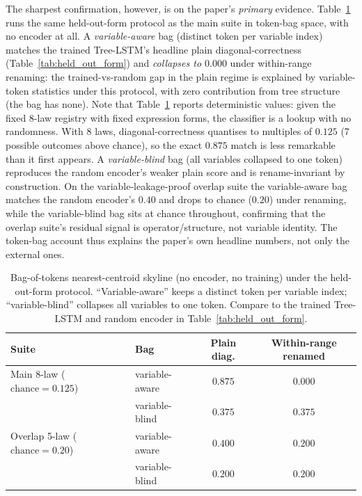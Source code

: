 The sharpest confirmation, however, is on the paper's \emph{primary} evidence. Table~\ref{tab:bagtokens} runs the same held-out-form protocol as the main suite in token-bag space, with no encoder at all. A \emph{variable-aware} bag (distinct token per variable index) matches the trained Tree-LSTM's headline plain diagonal-correctness (Table~\ref{tab:held_out_form}) and \emph{collapses to $0.000$} under within-range renaming: the trained-vs-random gap in the plain regime is explained by variable-token statistics under this protocol, with zero contribution from tree structure (the bag has none). Note that Table~\ref{tab:bagtokens} reports deterministic values: given the fixed 8-law registry with fixed expression forms, the classifier is a lookup with no randomness. With 8 laws, diagonal-correctness quantises to multiples of $0.125$ (7 possible outcomes above chance), so the exact $0.875$ match is less remarkable than it first appears. A \emph{variable-blind} bag (all variables collapsed to one token) reproduces the random encoder's weaker plain score and is rename-invariant by construction. On the variable-leakage-proof overlap suite the variable-aware bag matches the random encoder's $0.40$ and drops to chance ($0.20$) under renaming, while the variable-blind bag sits at chance throughout, confirming that the overlap suite's residual signal is operator/structure, not variable identity. The token-bag account thus explains the paper's own headline numbers, not only the external ones.

\begin{table}[h]
\centering
\caption{Bag-of-tokens nearest-centroid skyline (no encoder, no training) under the held-out-form protocol. ``Variable-aware'' keeps a distinct token per variable index; ``variable-blind'' collapses all variables to one token. Compare to the trained Tree-LSTM and random encoder in Table~\ref{tab:held_out_form}.}
\label{tab:bagtokens}
\begin{tabular}{llcc}
\toprule
Suite & Bag & Plain diag. & Within-range renamed \\
\midrule
Main 8-law ($\text{chance}=0.125$)    & variable-aware & $0.875$ & $0.000$ \\
                                       & variable-blind & $0.375$ & $0.375$ \\
\midrule
Overlap 5-law ($\text{chance}=0.20$)   & variable-aware & $0.400$ & $0.200$ \\
                                       & variable-blind & $0.200$ & $0.200$ \\
\bottomrule
\end{tabular}
\end{table}

